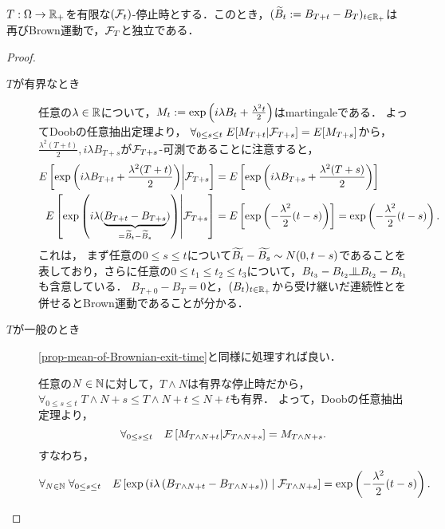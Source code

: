 \documentclass[uplatex,dvipdfmx]{jsreport}
\begin{document}
\begin{theorem}\mbox{}\\
    $T:\Omega\to\mathbb{R}_+$を有限な$(\mathcal{F}_t)$-停止時とする．このとき，$(\widetilde{B}_t:=B_{T+t}-B_T)_{t\in\mathbb{R}_+}$は再びBrown運動で，$\mathcal{F}_T$と独立である．
\end{theorem}
\begin{proof}\mbox{}
    \begin{description}
        \item[$T$が有界なとき]
        任意の$\lambda\in\mathbb{R}$について，$M_t:=\exp\left(i\lambda B_t+\frac{\lambda^2t}{2}\right)$はmartingaleである．
        よってDoobの任意抽出定理より，
        $\forall_{0\le s\le t}\;E[M_{T+t}|\mathcal{F}_{T+s}]=E[M_{T+s}]$から，$\frac{\lambda^2(T+t)}{2},i\lambda B_{T+s}$が$\mathcal{F}_{T+s}$-可測であることに注意すると，
        \begin{align*}
            E\left[\exp\left(i\lambda B_{T+t}+\frac{\lambda^2(T+t)}{2}\right)\middle|\mathcal{F}_{T+s}\right]&=E\left[\exp\left(i\lambda B_{T+s}+\frac{\lambda^2(T+s)}{2}\right)\right]\\
            E\left[\exp\left(i\lambda(\underbrace{B_{T+t}-B_{T+s}}_{=\widetilde{B}_t-\widetilde{B}_s})\right)\middle|\mathcal{F}_{T+s}\right]&=E\left[\exp\left(-\frac{\lambda^2}{2}(t-s)\right)\right]=\exp\left(-\frac{\lambda^2}{2}(t-s)\right).
        \end{align*}
        これは，
        まず任意の$0\le s\le t$について$\widetilde{B_t}-\widetilde{B_s}\sim N(0,t-s)$であることを表しており，さらに任意の$0\le t_1\le t_2\le t_3$について，$B_{t_3}-B_{t_2}\indep B_{t_2}-B_{t_1}$も含意している．
        $B_{T+0}-B_T=0$と，$(B_t)_{t\in\mathbb{R}_+}$から受け継いだ連続性とを併せるとBrown運動であることが分かる．
        \item[$T$が一般のとき] \ref{prop-mean-of-Brownian-exit-time}と同様に処理すれば良い．
        
        任意の$N\in\mathbb{N}$に対して，$T\land N$は有界な停止時だから，$\forall_{0\le s\le t}\;T\land N+s\le T\land N+t\le N+t$も有界．
        よって，Doobの任意抽出定理より，
        \[\forall_{0\le s\le t}\quad E\left[M_{T\land N+t}|\mathcal{F}_{T\land N+s}\right]=M_{T\land N+s}.\]
        すなわち，
        \[\forall_{N\in\mathbb{N}}\;\forall_{0\le s\le t}\quad E\left[\exp\left(i\lambda\left(B_{T\land N+t}-B_{T\land N+s}\right)\right)\;\middle|\;\mathcal{F}_{T\land N+s}\right]=\exp\left(-\frac{\lambda^2}{2}(t-s)\right).\]


\end{description}
\end{proof}
\end{document}
